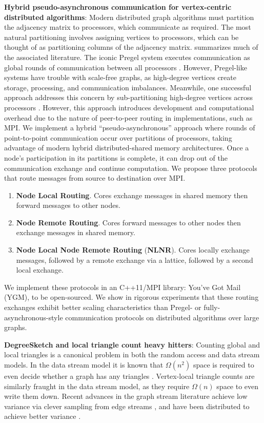 \documentclass[10]{report}
\newcommand{\algoname}[1]{\textnormal{\textsc{#1}}}
\begin{document}
\noindent
\textbf{Hybrid pseudo-asynchronous communication for vertex-centric distributed algorithms}:
Modern distributed graph algorithms must partition the adjacency matrix to processors, which communicate as required. 
The most natural partitioning involves assigning vertices to processors, which can be thought of as partitioning columns of the adjacency matrix.
\cite{mccune2015thinking} summarizes much of the associated literature.
The iconic Pregel system executes communication as global rounds of communication between all processors \cite{malewicz2010pregel}.
However, Pregel-like systems have trouble with scale-free graphs, as high-degree vertices create storage, processing, and communication imbalances.
Meanwhile, one successful approach addresses this concern by sub-partitioning high-degree vertices across processors \cite{pearce2014faster}.
However, this approach introduces development and computational overhead due to the nature of peer-to-peer routing in implementations, such as MPI.
We implement a hybrid ``pseudo-asynchronous'' approach where rounds of point-to-point communication occur over partitions of processors, taking advantage of modern hybrid distributed-shared memory architectures.
Once a node's participation in its partitions is complete, it can drop out of the communication exchange and continue computation.
We propose three protocols that route messages from source to destination over MPI. 
%
\begin{enumerate}
	\item \textbf{Node Local Routing}. Cores exchange messages in shared memory then forward messages to other nodes.
	\item \textbf{Node Remote Routing}. Cores forward messages to other nodes then exchange messages in shared memory.
	\item \textbf{Node Local Node Remote Routing} (\textbf{NLNR}). Cores locally exchange messages, followed by a remote exchange via a lattice, followed by a second local exchange. 
\end{enumerate}
%
We implement these protocols in an C++11/MPI library: You've Got Mail (\algoname{YGM}), to be open-sourced.
We show in rigorous experiments that these routing exchanges exhibit better scaling characteristics than Pregel- or fully-asynchronous-style communication protocols on distributed algorithms over large graphs.

\noindent
\textbf{DegreeSketch and local triangle count heavy hitters}:
Counting global and local triangles is a canonical problem in both the random access and data stream models. 
In the data stream model it is known that $\Omega(n^2)$ space is required to even decide whether a graph has any triangles \cite{bar2002reductions}.
Vertex-local triangle counts are similarly fraught in the data stream model, as they require $\Omega(n)$ space to even write them down. 
Recent advances in the graph stream literature achieve low variance via clever sampling from edge streams \cite{becchetti2008efficient, lim2015mascot, stefani2017triest}, and have been distributed to achieve better variance \cite{shin2018tri, shin2018dislr}.
\end{document}
